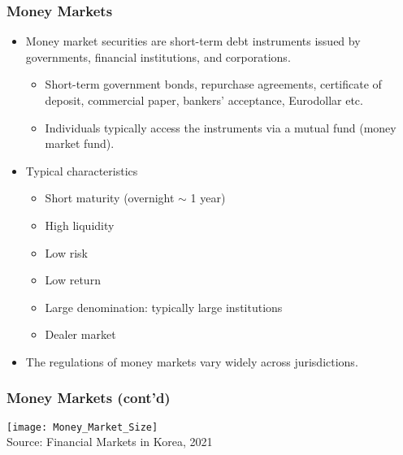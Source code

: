 \documentclass[10pt]{beamer}
\begin{document}
	
	\begin{frame}
		\frametitle{Money Markets}
		
		\begin{itemize}
			\item Money market securities are short-term debt instruments issued by governments, financial institutions, and corporations.
			\begin{itemize}
				\item Short-term government bonds, repurchase agreements, certificate of deposit, commercial paper, bankers' acceptance, Eurodollar etc.
				\item Individuals typically access the instruments via a mutual fund (money market fund).
			\end{itemize}
			
			\item Typical characteristics
			\begin{itemize}
				\item Short maturity (overnight $\sim$ 1 year)
				\item High liquidity
				\item Low risk
				\item Low return
				\item Large denomination: typically large institutions
				\item Dealer market
			\end{itemize}
			
			\item The regulations of money markets vary widely across jurisdictions.
			
		\end{itemize}
		
	\end{frame}
	
	
	\begin{frame}
		\frametitle{Money Markets (cont'd)} \vspace{-10pt}
		\begin{center}
			\texttt{[image: Money\_Market\_Size]} \\
			{\scriptsize Source: Financial Markets in Korea, 2021}		
		\end{center}
		
	\end{frame}
	
	
	
\end{document}
